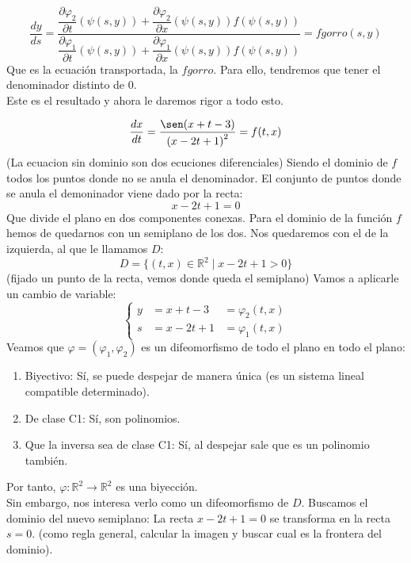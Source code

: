 \begin{equation*}
    \dfrac{dy}{ds} = \dfrac{\dfrac{\partial\varphi_2}{\partial t}(\psi(s,y)) + \dfrac{\partial\varphi_2}{\partial x}(\psi(s,y))f(\psi(s,y))}{\dfrac{\partial\varphi_1}{\partial t}(\psi(s,y)) + \dfrac{\partial\varphi_1}{\partial x}(\psi(s,y)) f(\psi(s,y))}  = fgorro(s,y)
\end{equation*}
Que es la ecuación transportada, la $fgorro$. Para ello, tendremos que tener el denominador distinto de 0.\\

Este es el resultado y ahora le daremos rigor a todo esto.

\begin{ejemplo}
    \begin{equation*}
        \dfrac{dx}{dt} = \dfrac{\sen(x+t-3)}{{(x-2t+1)}^{2}} = f(t,x)
    \end{equation*}
    (La ecuacion sin dominio son dos ecuciones diferenciales)
    Siendo el dominio de $f$ todos los puntos donde no se anula el denominador.
    El conjunto de puntos donde se anula el demoninador viene dado por la recta:
    \begin{equation*}
        x-2t+1 = 0
    \end{equation*}
    Que divide el plano en dos componentes conexas. Para el dominio de la función $f$ hemos de quedarnos con un semiplano de los dos. Nos quedaremos con el de la izquierda, al que le llamamos $D$:
    \begin{equation*}
        D = \{(t,x)\in \mathbb{R}^2 \mid x -2t+1>0 \}
    \end{equation*}
    (fijado un punto de la recta, vemos donde queda el semiplano)
    Vamos a aplicarle un cambio de variable:
    \begin{equation*}
        \left\{\begin{array}{rll}
            y &= x+t-3 &= \varphi_2(t,x) \\
            s &= x-2t+1 &= \varphi_1(t,x)
        \end{array}\right.
    \end{equation*}
    Veamos que $\varphi = (\varphi_1,\varphi_2)$ es un difeomorfismo de todo el plano en todo el plano:
    \begin{enumerate}
        \item Biyectivo: Sí, se puede despejar de manera única (es un sistema lineal compatible determinado).
        \item De clase C1: Sí, son polinomios.
        \item Que la inversa sea de clase C1: Sí, al despejar sale que es un polinomio también.
    \end{enumerate}
    Por tanto, $\varphi:\mathbb{R}^2\rightarrow\mathbb{R}^2$ es una biyección.\\
    Sin embargo, nos interesa verlo como un difeomorfismo de $D$. Buscamos el dominio del nuevo semiplano:
    La recta $x-2t+1=0$ se transforma en la recta $s=0$.
    (como regla general, calcular la imagen y buscar cual es la frontera del dominio).


\end{ejemplo}
